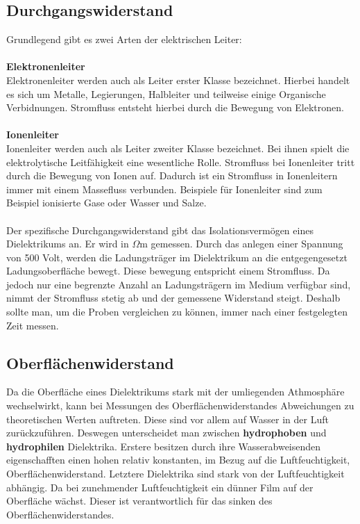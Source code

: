 \documentclass[a4paper,twoside,12pt,DIV=13,BCOR=5mm,numbers=noenddot,cleardoublepage=empty]{scrbook}
\begin{document}
        \subsection{Durchgangswiderstand}
        Grundlegend gibt es zwei Arten der elektrischen Leiter: \\
        \\
        \textbf{Elektronenleiter} \\
        Elektronenleiter werden auch als Leiter erster Klasse bezeichnet.
        Hierbei handelt es sich um Metalle, Legierungen, Halbleiter und
        teilweise einige Organische Verbidnungen. Stromfluss entsteht hierbei durch 
        die Bewegung von Elektronen.
        \\
        \\
        \textbf{Ionenleiter} \\
        Ionenleiter werden auch als Leiter zweiter Klasse bezeichnet. Bei ihnen
        spielt die elektrolytische Leitf\"ahigkeit eine wesentliche Rolle. 
        Stromfluss bei Ionenleiter tritt durch die Bewegung von Ionen auf. Dadurch
        ist ein Stromfluss in Ionenleitern immer mit einem Massefluss verbunden.
        Beispiele f\"ur Ionenleiter sind zum Beispiel ionisierte Gase oder Wasser und Salze.
        \\
        \\
        Der spezifische Durchgangswiderstand gibt das Isolationsverm\"ogen
        eines Dielektrikums an. Er wird in $\Omega$m gemessen. Durch das anlegen
        einer Spannung von 500 Volt, werden die Ladungstr\"ager im Dielektrikum
        an die entgegengesetzt Ladungsoberfl\"ache bewegt. Diese bewegung entspricht
        einem Stromfluss. Da jedoch nur eine begrenzte Anzahl an Ladungstr\"agern
        im Medium verf\"ugbar sind, nimmt der Stromfluss stetig ab und der gemessene Widerstand
        steigt. Deshalb sollte man, um die Proben vergleichen zu k\"onnen, immer nach
        einer festgelegten Zeit messen. 
        \subsection{Oberfl\"achenwiderstand}
        Da die Oberfl\"ache eines Dielektrikums stark mit der umliegenden
        Athmosph\"are wechselwirkt, kann bei Messungen des Oberfl\"achenwiderstandes
        Abweichungen zu theoretischen Werten auftreten. Diese sind vor allem auf Wasser
        in der Luft zur\"uckzuf\"uhren. Deswegen unterscheidet man zwischen
        \textbf{hydrophoben} und \textbf{hydrophilen} Dielektrika. Erstere besitzen
        durch ihre Wasserabweisenden eigenschafften einen hohen relativ konstanten, 
        im Bezug auf die Luftfeuchtigkeit, Oberfl\"achenwiderstand. Letztere Dielektrika
        sind stark von der Luftfeuchtigkeit abh\"angig. Da bei zunehmender Luftfeuchtigkeit
        ein d\"unner Film auf der Oberfl\"ache w\"achst. Dieser ist verantwortlich f\"ur das
        sinken des Oberfl\"achenwiderstandes.
\end{document}
